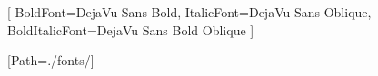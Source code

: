 \usepackage{fontspec}
\usepackage{newunicodechar}

\setmainfont{DejaVu Sans}[
  BoldFont={DejaVu Sans Bold},
  ItalicFont={DejaVu Sans Oblique},
  BoldItalicFont={DejaVu Sans Bold Oblique}
]

\setmonofont{DejaVu Sans Mono}

\newfontfamily{}[Path=./fonts/]

